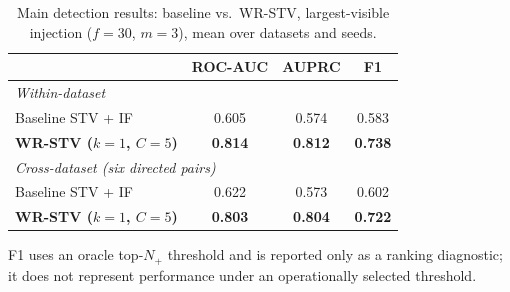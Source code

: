 \documentclass[informatics,article,submit,moreauthors]{Definitions/mdpi}
\newcommand{\rev}[1]{{\color{revisionblue}#1}}
\begin{document}
\begin{table}[t]
    \centering
    \caption{Main detection results: baseline vs.\ WR-STV, largest-visible
        injection (\(f=30\), \(m=3\)), mean over datasets and seeds.}
    \label{tab:main-results}
    \begin{tabular}{lccc}
        \toprule
        & \textbf{ROC-AUC} & \textbf{AUPRC} & \textbf{F1} \\
        \midrule
        \multicolumn{4}{l}{\textit{Within-dataset}} \\
        Baseline STV + IF
        & 0.605 & 0.574 & 0.583 \\
        \textbf{WR-STV (\(k=1\), \(C=5\))}
        & \textbf{0.814} & \textbf{0.812} & \textbf{0.738} \\
        \midrule
        \multicolumn{4}{l}{\textit{Cross-dataset (six directed pairs)}} \\
        Baseline STV + IF
        & 0.622 & 0.573 & 0.602 \\
        \textbf{WR-STV (\(k=1\), \(C=5\))}
        & \textbf{0.803} & \textbf{0.804} & \textbf{0.722} \\
        \bottomrule
    \end{tabular}

    \vspace{3pt}
    \footnotesize
    \rev{F1 uses an oracle top-\(N_{+}\) threshold and is reported only as
    a ranking diagnostic; it does not represent performance under an
    operationally selected threshold.}
\end{table}
\end{document}
